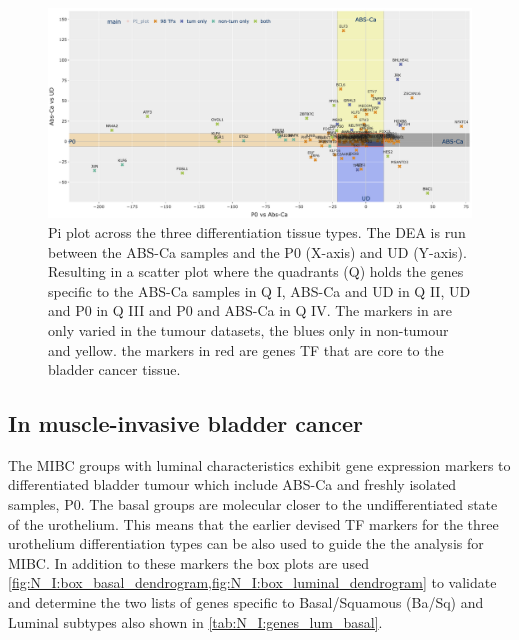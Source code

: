 \begin{figure}
    \includegraphics[width=1.0\textwidth,height=1.0\textheight,keepaspectratio]{Sections/Network_I/Resources/selective_pruning/sel_tfs/sel_tfs_pi_all_var_rect.png}
    \caption[The 98 TF and the DEA across the non-tumour datasets]{Pi plot across the three differentiation tissue types. The DEA is run between the ABS-Ca samples and the P0 (X-axis) and UD (Y-axis). Resulting in a scatter plot where the quadrants (Q) holds the genes specific to the ABS-Ca samples in Q I, ABS-Ca and UD in Q II, UD and P0 in Q III and P0 and ABS-Ca in Q IV. The markers in 
    are only varied in the tumour datasets, the blues only in non-tumour and yellow. the markers in red are genes TF that are core to the bladder cancer tissue. }
    \label{fig:N_I:pi_sel_tfs_var}
\end{figure}

\newpage


\subsection{In muscle-invasive bladder cancer} \label{s:N_I:sel_tfs_cancer}


The MIBC groups with luminal characteristics exhibit gene expression markers to differentiated bladder tumour which include ABS-Ca and freshly isolated samples, P0. The basal groups are molecular closer to the undifferentiated state of the urothelium. This means that the earlier devised TF markers for the three urothelium differentiation types can be also used to guide the the analysis for MIBC. In addition to these markers the box plots are used \cref{fig:N_I:box_basal_dendrogram,fig:N_I:box_luminal_dendrogram} to validate and determine the two lists of genes specific to Basal/Squamous (Ba/Sq) and Luminal subtypes  also shown in \cref{tab:N_I:genes_lum_basal}. 

